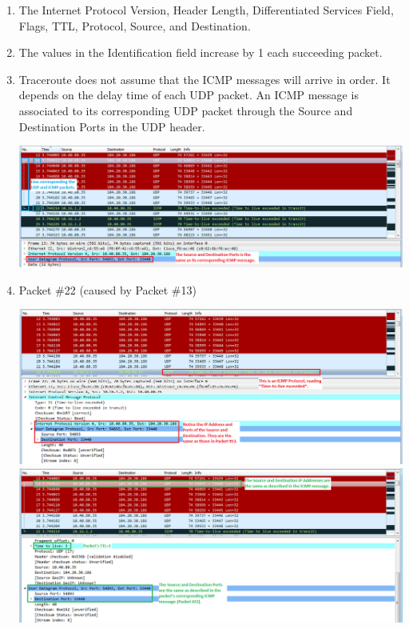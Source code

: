 \documentclass[11pt]{article}
\begin{document}
\begin{enumerate}
\item
The Internet Protocol Version, Header Length, Differentiated Services Field, Flags, TTL, Protocol, Source, and Destination.

\item
The values in the Identification field increase by 1 each succeeding packet.

\item
Traceroute does not assume that the ICMP messages will arrive in order. It depends on the delay time of each UDP packet. An ICMP message is associated to its corresponding UDP packet through the Source and Destination Ports in the UDP header.
\begin{center}
\includegraphics[scale=0.5]{Q8}
\end{center}

\item
Packet \#22 (caused by Packet \#13)
\begin{center}
\includegraphics[scale=0.5]{Q9A} \\
\includegraphics[scale=0.5]{Q9B}
\end{center}


\end{enumerate}
\end{document}
